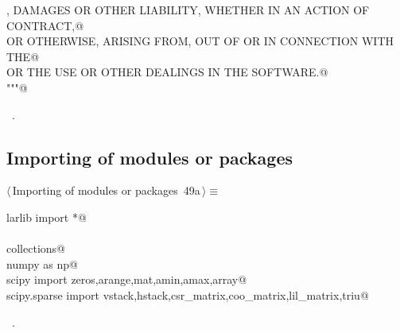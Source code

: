 \documentclass[11pt,oneside]{article}    %
\begin{document}
\begin{flushleft}
\begin{list}{}{}
\mbox{}\verb@CLAIM, DAMAGES OR OTHER LIABILITY, WHETHER IN AN ACTION OF CONTRACT,@\\
\mbox{}\verb@TORT OR OTHERWISE, ARISING FROM, OUT OF OR IN CONNECTION WITH THE@\\
\mbox{}\verb@SOFTWARE OR THE USE OR OTHER DEALINGS IN THE SOFTWARE.@\\
\mbox{}\verb@"""@\\
\mbox{}\verb@@{\NWsep}
\end{list}
\vspace{-1ex}
\footnotesize\addtolength{\baselineskip}{-1ex}
\begin{list}{}{\setlength{\itemsep}{-\parsep}\setlength{\itemindent}{-\leftmargin}}
\item \NWtxtMacroRefIn\ .
\end{list}
\end{flushleft}
\subsection{Importing of modules or packages}
\begin{flushleft} \small \label{scrap80}
\protect{}$\langle\,$Importing of modules or packages\nobreak\ {\footnotesize 49a}$\,\rangle\equiv$
\vspace{-1ex}
\begin{list}{}{} \item
\mbox{}\verb@from larlib import *@\\
\mbox{}\verb@@\\
\mbox{}\verb@import collections@\\
\mbox{}\verb@import numpy as np@\\
\mbox{}\verb@from scipy import zeros,arange,mat,amin,amax,array@\\
\mbox{}\verb@from scipy.sparse import vstack,hstack,csr_matrix,coo_matrix,lil_matrix,triu@\\
\mbox{}\verb@@{\NWsep}
\end{list}
\vspace{-1ex}
\footnotesize\addtolength{\baselineskip}{-1ex}
\begin{list}{}{\setlength{\itemsep}{-\parsep}\setlength{\itemindent}{-\leftmargin}}
\item \NWtxtMacroRefIn\ .
\end{list}
\end{flushleft}
\end{document}
